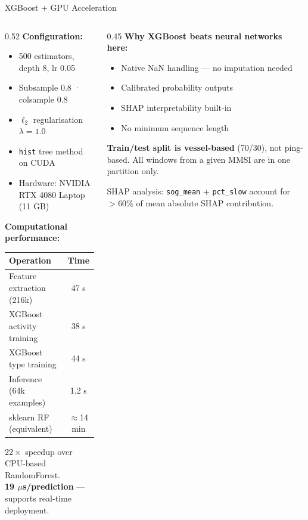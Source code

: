 \documentclass[aspectratio=169,10pt]{beamer}
\begin{document}
\begin{frame}{XGBoost + GPU Acceleration}
  \begin{columns}[T]
    \begin{column}{0.52\textwidth}
      \textbf{Configuration:}
      \begin{itemize}
        \item 500 estimators, depth 8, lr 0.05
        \item Subsample 0.8 · colsample 0.8
        \item $\ell_2$ regularisation $\lambda = 1.0$
        \item \texttt{hist} tree method on CUDA
        \item Hardware: NVIDIA RTX 4080 Laptop (11 GB)
      \end{itemize}

      \bigskip
      \textbf{Computational performance:}
      \begin{tabular}{lc}
        \toprule
        Operation & Time \\
        \midrule
        Feature extraction (216k) & 47 s \\
        XGBoost activity training  & 38 s \\
        XGBoost type training      & 44 s \\
        Inference (64k examples)   & 1.2 s \\
        sklearn RF (equivalent)    & $\approx$14 min \\
        \bottomrule
      \end{tabular}

      \medskip
      \alert{$22\times$ speedup} over CPU-based RandomForest.\\
      \textbf{19 $\mu$s/prediction} — supports real-time deployment.
    \end{column}
    \begin{column}{0.45\textwidth}
      \textbf{Why XGBoost beats neural networks here:}
      \begin{itemize}
        \item Native NaN handling — no imputation needed
        \item Calibrated probability outputs
        \item SHAP interpretability built-in
        \item No minimum sequence length
      \end{itemize}

      \bigskip
      \textbf{Train/test split is vessel-based} (70/30), not ping-based.
      All windows from a given MMSI are in one partition only.

      \bigskip
      SHAP analysis: \texttt{sog\_mean} + \texttt{pct\_slow} account for
      $>60\%$ of mean absolute SHAP contribution.
    \end{column}
  \end{columns}
\end{frame}
\end{document}

